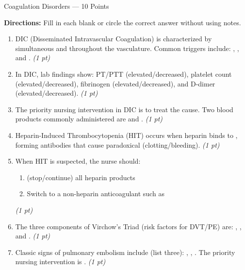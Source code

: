 \documentclass[11pt,letterpaper]{article}
\newcommand{\blank}[1][3cm]{\underline{\hspace{#1}}}
\begin{document}
\begin{diagbox}{Coagulation Disorders --- 10 Points}

\textbf{Directions:} Fill in each blank or circle the correct answer without using notes.

\begin{enumerate}[leftmargin=1.5em, label=\textbf{\arabic*.}]

  \item DIC (Disseminated Intravascular Coagulation) is characterized by simultaneous
        \blank[3cm] and \blank[3cm] throughout the vasculature.
        Common triggers include: \blank[3cm], \blank[3cm], and \blank[3cm].
        \hfill\textit{(1 pt)}

  \item In DIC, lab findings show: PT/PTT \blank[2cm] (elevated/decreased),
        platelet count \blank[2cm] (elevated/decreased), fibrinogen \blank[2cm]
        (elevated/decreased), and D-dimer \blank[2cm] (elevated/decreased).
        \hfill\textit{(1 pt)}

  \item The priority nursing intervention in DIC is to treat the
        \blank[4cm] cause.  Two blood products commonly administered are
        \blank[3cm] and \blank[3cm].
        \hfill\textit{(1 pt)}

  \item Heparin-Induced Thrombocytopenia (HIT) occurs when heparin binds to
        \blank[4cm], forming antibodies that cause paradoxical
        \blank[3cm] (clotting/bleeding).
        \hfill\textit{(1 pt)}

  \item When HIT is suspected, the nurse should:
        \begin{enumerate}[label=\alph*.]
          \item \blank[6cm] (stop/continue) all heparin products
          \item Switch to a non-heparin anticoagulant such as \blank[4cm]
        \end{enumerate}
        \hfill\textit{(1 pt)}

  \item The three components of Virchow's Triad (risk factors for DVT/PE) are:
        \blank[3.5cm], \blank[3.5cm], and \blank[3.5cm].
        \hfill\textit{(1 pt)}

  \item Classic signs of pulmonary embolism include (list three):
        \blank[3.5cm], \blank[3.5cm], \blank[3.5cm].
        The priority nursing intervention is \blank[4cm].
        \hfill\textit{(1 pt)}


\end{enumerate}
\end{diagbox}
\end{document}
